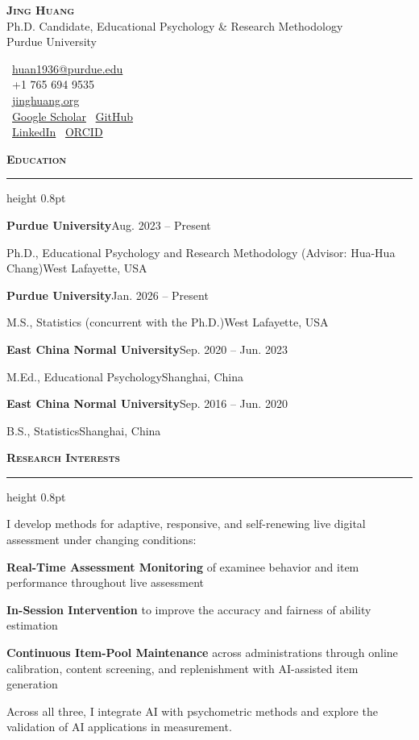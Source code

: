 \documentclass[10.5pt,letterpaper]{article}
\renewcommand{\section}[1]{%
  \needspace{3\baselineskip}\vspace{12pt}\par
  {\fontsize{13.5}{16}\selectfont\bfseries\scshape\color{accent}#1}\hspace{6pt}%
  {\color{accent}\leaders\hrule height 0.8pt\hfill\kern0pt}\par\vspace{6pt}}
\newcommand{\entry}[4]{%
  \needspace{2\baselineskip}%
  {\color{textdark}\textbf{#1}}\hfill{#2}\par
  {#3}\hfill{#4}\par\vspace{3pt}}
\begin{document}
\begin{minipage}[b]{0.62\textwidth}
  {\Huge\scshape\bfseries\color{textdark}Jing Huang}\\[4pt]
  {\color{textgray}Ph.D. Candidate, Educational Psychology \& Research Methodology}\\
  {\color{textgray}Purdue University}
\end{minipage}\hfill
\begin{minipage}[b]{0.36\textwidth}
  \raggedleft\small
  \faEnvelope[regular]~\href{mailto:huan1936@purdue.edu}{huan1936@purdue.edu}\\
  \faPhone*~+1 765 694 9535\\
  \faGlobe~\href{https://jinghuang.org}{jinghuang.org}\\
  \faGraduationCap~\href{https://scholar.google.com/citations?user=KYPNfGYAAAAJ}{Google Scholar}\quad
  \faGithub~\href{https://github.com/Jeanwong1222}{GitHub}\\
  \faLinkedin~\href{https://www.linkedin.com/in/jing-huang-85645a292}{LinkedIn}\quad
  \faOrcid~\href{https://orcid.org/0009-0007-9235-6950}{ORCID}
\end{minipage}
\vspace{4pt}

\section{Education}
\entry{Purdue University}{Aug. 2023 -- Present}{Ph.D., Educational Psychology and Research Methodology (Advisor: Hua-Hua Chang)}{West Lafayette, USA}
\entry{Purdue University}{Jan. 2026 -- Present}{M.S., Statistics (concurrent with the Ph.D.)}{West Lafayette, USA}
\entry{East China Normal University}{Sep. 2020 -- Jun. 2023}{M.Ed., Educational Psychology}{Shanghai, China}
\entry{East China Normal University}{Sep. 2016 -- Jun. 2020}{B.S., Statistics}{Shanghai, China}

\section{Research Interests}
I develop methods for adaptive, responsive, and self-renewing live digital assessment under changing conditions:
\begin{cvbullets}
  \item \textbf{Real-Time Assessment Monitoring} of examinee behavior and item performance throughout live assessment
  \item \textbf{In-Session Intervention} to improve the accuracy and fairness of ability estimation
  \item \textbf{Continuous Item-Pool Maintenance} across administrations through online calibration, content screening, and replenishment with AI-assisted item generation
\end{cvbullets}
Across all three, I integrate AI with psychometric methods and explore the validation of AI applications in \mbox{measurement}.
\end{document}
